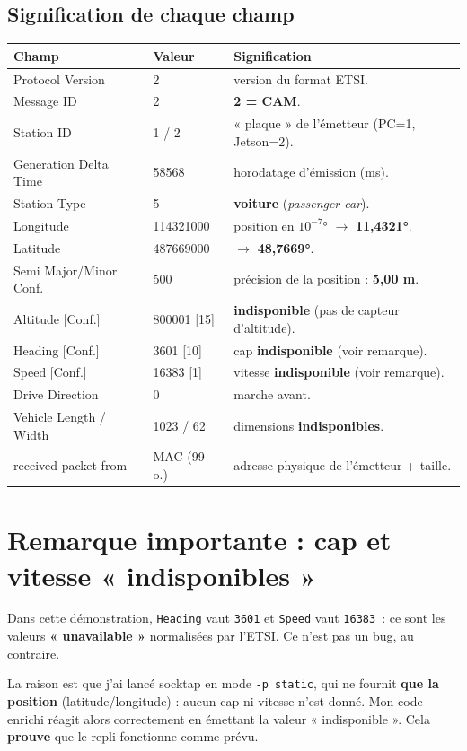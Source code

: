 \documentclass[a4paper,11pt]{article}
\newcommand{\code}[1]{\texttt{#1}}
\begin{document}
\subsection{Signification de chaque champ}
\begin{tabularx}{\textwidth}{@{}l l X@{}}
\toprule
\textbf{Champ} & \textbf{Valeur} & \textbf{Signification} \\
\midrule
Protocol Version & 2 & version du format ETSI. \\
Message ID & 2 & \textbf{2 = CAM}. \\
Station ID & 1 / 2 & « plaque » de l'émetteur (PC=1, Jetson=2). \\
Generation Delta Time & 58568 & horodatage d'émission (ms). \\
Station Type & 5 & \textbf{voiture} (\emph{passenger car}). \\
Longitude & 114321000 & position en $10^{-7}$° $\rightarrow$ \textbf{11,4321°}. \\
Latitude & 487669000 & $\rightarrow$ \textbf{48,7669°}. \\
Semi Major/Minor Conf. & 500 & précision de la position : \textbf{5,00 m}. \\
Altitude [Conf.] & 800001 [15] & \textbf{indisponible} (pas de capteur d'altitude). \\
Heading [Conf.] & 3601 [10] & cap \textbf{indisponible} (voir remarque). \\
Speed [Conf.] & 16383 [1] & vitesse \textbf{indisponible} (voir remarque). \\
Drive Direction & 0 & marche avant. \\
Vehicle Length / Width & 1023 / 62 & dimensions \textbf{indisponibles}. \\
received packet from & MAC (99 o.) & adresse physique de l'émetteur + taille. \\
\bottomrule
\end{tabularx}

\section{Remarque importante : cap et vitesse « indisponibles »}
Dans cette démonstration, \code{Heading} vaut \code{3601} et \code{Speed} vaut
\code{16383}~: ce sont les valeurs \textbf{« unavailable »} normalisées par l'ETSI. Ce
n'est pas un bug, au contraire.

La raison est que j'ai lancé socktap en mode \code{-p static}, qui ne fournit
\textbf{que la position} (latitude/longitude) : aucun cap ni vitesse n'est donné. Mon code
enrichi réagit alors correctement en émettant la valeur « indisponible ». Cela
\textbf{prouve} que le repli fonctionne comme prévu.
\end{document}
